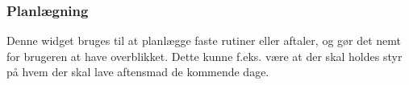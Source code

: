 \subsubsection{Planlægning}
Denne widget bruges til at planlægge faste rutiner eller aftaler, og gør det nemt for brugeren at have overblikket. Dette kunne f.eks. være at der skal holdes styr på hvem der skal lave aftensmad de kommende dage. 







